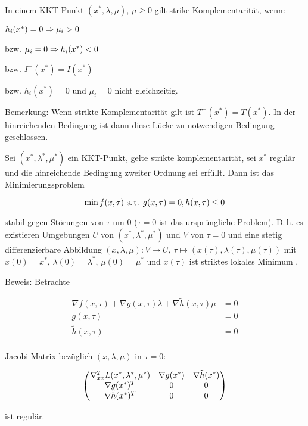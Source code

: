 
In einem KKT-Punkt $(x^*, \lambda, \mu)$, $\mu \geq 0$ gilt strike Komplementarität, wenn:

\bitm
\item $h_i(x^*) = 0 \Rightarrow \mu_i > 0$
\item bzw. $\mu_i = 0 \Rightarrow h_i(x^*) < 0$
\item bzw. $I^+(x^*) = I(x^*)$
\item bzw. $h_i(x^*) = 0$ und $\mu_i = 0$ nicht gleichzeitig.
\eitm

Bemerkung: Wenn strikte Komplementarität gilt ist $T^+(x^*) = T(x^*)$. In der hinreichenden Bedingung ist dann diese Lücke zu notwendigen Bedingung geschlossen.


 
Sei $(x^*, \lambda^*, \mu^*)$ ein KKT-Punkt, gelte strikte komplementarität, sei $x^*$ regulär und die hinreichende Bedingung zweiter Ordnung sei erfüllt. Dann ist das Minimierungsproblem

\[ \min f(x,\tau) \text{ s.\,t. } g(x,\tau)=0, h(x,\tau) \leq 0 \]

stabil gegen Störungen von $\tau$ um $0$ ($\tau=0$ ist das ursprüngliche Problem). D.\,h. es existieren Umgebungen $U$ von $(x^*, \lambda^*, \mu^*)$ und $V$ von $\tau = 0$ und eine stetig differenzierbare Abbildung $(x,\lambda, \mu)\colon V \to U$, $\tau \mapsto (x(\tau), \lambda(\tau), \mu(\tau))$ mit $x(0) = x^*$, $\lambda(0) = \lambda^*$, $\mu(0) = \mu^*$ und $x(\tau)$ ist striktes lokales Minimum .

Beweis:
Betrachte

\begin{align*}
\nabla f(x,\tau) + \nabla g(x,\tau) \lambda + \nabla \tilde h(x,\tau) \mu &= 0 \\
g(x,\tau) &= 0 \\
\tilde h(x,\tau) &= 0 \\
\end{align*}

Jacobi-Matrix bezüglich $(x,\lambda, \mu)$ in $\tau = 0$:


\[ \begin{pmatrix} \nabla_{xx}^2 L(x^*, \lambda^*, \mu^*) & \nabla g(x^*) & \nabla \tilde h(x^*) \\ \nabla g(x^*)^T & 0 & 0 \\ \nabla \tilde h(x^*)^T & 0 & 0 \end{pmatrix} \]

ist regulär.

